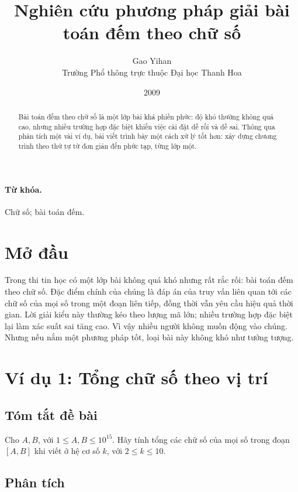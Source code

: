 \documentclass[11pt]{article}
\title{Nghiên cứu phương pháp giải bài toán đếm theo chữ số}
\author{Gao Yihan\\Trường Phổ thông trực thuộc Đại học Thanh Hoa}
\date{2009}
\begin{document}
\maketitle


\begin{abstract}
Bài toán đếm theo chữ số là một lớp bài khá phiền phức: độ khó thường không
quá cao, nhưng nhiều trường hợp đặc biệt khiến việc cài đặt dễ rối và dễ sai.
Thông qua phân tích một vài ví dụ, bài viết trình bày một cách xử lý tốt hơn:
xây dựng chương trình theo thứ tự từ đơn giản đến phức tạp, từng lớp một.
\end{abstract}

\paragraph{Từ khóa.}
Chữ số; bài toán đếm.

\section{Mở đầu}

Trong thi tin học có một lớp bài không quá khó nhưng rất rắc rối: bài toán đếm
theo chữ số. Đặc điểm chính của chúng là đáp án của truy vấn liên quan tới các
chữ số của mọi số trong một đoạn liên tiếp, đồng thời vẫn yêu cầu hiệu quả
thời gian. Lời giải kiểu này thường kéo theo lượng mã lớn; nhiều trường hợp
đặc biệt lại làm xác suất sai tăng cao. Vì vậy nhiều người không muốn động vào
chúng. Nhưng nếu nắm một phương pháp tốt, loại bài này không khó như tưởng
tượng.

\section{Ví dụ 1: Tổng chữ số theo vị trí}

\subsection*{Tóm tắt đề bài}

Cho \(A,B\), với \(1\le A,B\le 10^{15}\). Hãy tính tổng các chữ số của mọi số
trong đoạn \([A,B]\) khi viết ở hệ cơ số \(k\), với \(2\le k\le 10\).

\subsection*{Phân tích}
\end{document}
